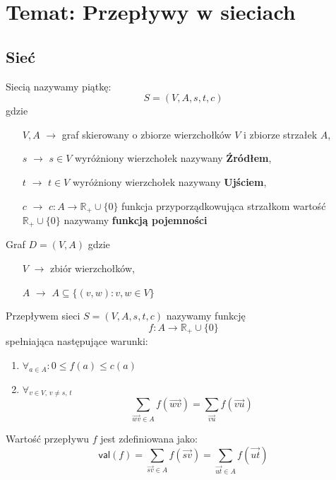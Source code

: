 \section[Wykład 6: 30-III-2017 - Temat: Przepływy w sieciach]{Temat: Przepływy w sieciach}
\subsection{Sieć}
\begin{definition}[Sieć]
Siecią nazywamy piątkę: $$S=(V,A,s,t,c)$$ gdzie
\begin{itemize}
\item[$V,A$] $\rightarrow $ graf skierowany o zbiorze wierzchołków $V$ i zbiorze strzałek $A$,
\item[$s$] $\rightarrow $ $s\in V$ wyróżniony wierzchołek nazywany \textbf{Źródłem},
\item[$t$] $\rightarrow $ $t\in V$ wyróżniony wierzchołek nazywany \textbf{Ujściem},
\item[$c$] $\rightarrow $ $c:A\rightarrow \mathbb{R} _+\cup \{0\}$ funkcja przyporządkowująca strzałkom wartość $\mathbb{R} _+\cup \{0\}$ nazywamy \textbf{funkcją pojemności}
\end{itemize}
\end{definition}
\begin{definition}
Graf $D=(V,A)$ gdzie 
\begin{itemize}
\item[$V$] $\rightarrow $ zbiór wierzchołków,
\item[$A$] $\rightarrow $ $A\subseteq \{(v,w):v,w\in V\}$
\end{itemize}
\end{definition}
\begin{definition}
Przepływem sieci $S=(V,A,s,t,c)$ nazywamy funkcję $$f:A\rightarrow \mathbb{R}_+\cup \{0\}$$ spełniająca następujące warunki:
\begin{enumerate}[label=\alph*)]
\item $\forall _{a\in A}: 0\leq f(a)\leq c(a)$
\item $\forall _{v\in V,\, v\neq s,\, t}$
$$\sum _{\vec{wv}\in A}f(\vec{wv})=\sum _{\vec{vu}}f(\vec{vu})$$
\end{enumerate}
\end{definition}
\begin{definition}
Wartość przepływu $f$ jest zdefiniowana jako:
$$\mathsf{val}(f)=\sum _{\vec{sv}\in A}f(\vec{sv})=\sum _{\vec{ut}\in A} f(\vec{ut})$$
\end{definition}

